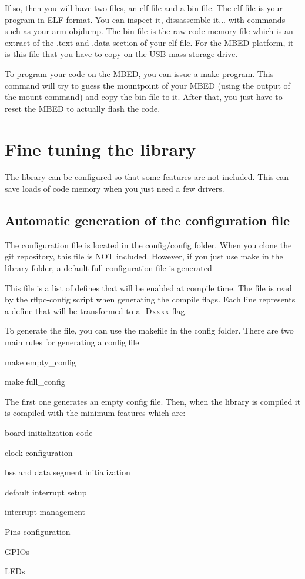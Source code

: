 If so, then you will have two files, an elf file and a bin file. The elf file is your program in E\-L\-F format. You can inspect it, dissassemble it... with commands such as your arm objdump. The bin file is the raw code memory file which is an extract of the {\ttfamily }.text and {\ttfamily }.data section of your elf file. For the M\-B\-E\-D platform, it is this file that you have to copy on the U\-S\-B mass storage drive.

To program your code on the M\-B\-E\-D, you can issue a {\ttfamily make program}. This command will try to guess the mountpoint of your M\-B\-E\-D (using the output of the {\ttfamily mount} command) and copy the bin file to it. After that, you just have to reset the M\-B\-E\-D to actually flash the code.\hypertarget{start_config}{}\section{Fine tuning the library}\label{start_config}
The library can be configured so that some features are not included. This can save loads of code memory when you just need a few drivers. \hypertarget{start_config-file}{}\subsection{Automatic generation of the configuration file}\label{start_config-file}
The configuration file is located in the config/config folder. When you clone the git repository, this file is N\-O\-T included. However, if you just use {\ttfamily make} in the library folder, a default full configuration file is generated

This file is a list of defines that will be enabled at compile time. The file is read by the {\ttfamily rflpc-\/config} script when generating the compile flags. Each line represents a define that will be transformed to a {\ttfamily -\/\-Dxxxx} flag.

To generate the file, you can use the makefile in the config folder. There are two main rules for generating a config file
\begin{DoxyItemize}
\item {\ttfamily make empty\-\_\-config}
\item {\ttfamily make full\-\_\-config}
\end{DoxyItemize}

The first one generates an empty config file. Then, when the library is compiled it is compiled with the minimum features which are\-:
\begin{DoxyItemize}
\item board initialization code
\begin{DoxyItemize}
\item clock configuration
\item bss and data segment initialization
\item default interrupt setup
\end{DoxyItemize}
\item interrupt management
\item Pins configuration
\item G\-P\-I\-Os
\item L\-E\-Ds
\end{DoxyItemize}

